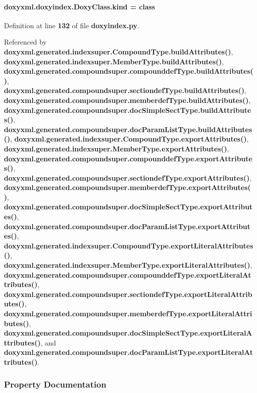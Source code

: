 \paragraph[{kind}]{ doxyxml.\+doxyindex.\+Doxy\+Class.\+kind = \textquotesingle{}class\textquotesingle{}\hspace{0.3cm}{\ttfamily [static]}}\label{classdoxyxml_1_1doxyindex_1_1DoxyClass_a4d98411ad8496f2dfd061280b97adfd7}


Definition at line {\bf 132} of file {\bf doxyindex.\+py}.



Referenced by {\bf doxyxml.\+generated.\+indexsuper.\+Compound\+Type.\+build\+Attributes()}, {\bf doxyxml.\+generated.\+indexsuper.\+Member\+Type.\+build\+Attributes()}, {\bf doxyxml.\+generated.\+compoundsuper.\+compounddef\+Type.\+build\+Attributes()}, {\bf doxyxml.\+generated.\+compoundsuper.\+sectiondef\+Type.\+build\+Attributes()}, {\bf doxyxml.\+generated.\+compoundsuper.\+memberdef\+Type.\+build\+Attributes()}, {\bf doxyxml.\+generated.\+compoundsuper.\+doc\+Simple\+Sect\+Type.\+build\+Attributes()}, {\bf doxyxml.\+generated.\+compoundsuper.\+doc\+Param\+List\+Type.\+build\+Attributes()}, {\bf doxyxml.\+generated.\+indexsuper.\+Compound\+Type.\+export\+Attributes()}, {\bf doxyxml.\+generated.\+indexsuper.\+Member\+Type.\+export\+Attributes()}, {\bf doxyxml.\+generated.\+compoundsuper.\+compounddef\+Type.\+export\+Attributes()}, {\bf doxyxml.\+generated.\+compoundsuper.\+sectiondef\+Type.\+export\+Attributes()}, {\bf doxyxml.\+generated.\+compoundsuper.\+memberdef\+Type.\+export\+Attributes()}, {\bf doxyxml.\+generated.\+compoundsuper.\+doc\+Simple\+Sect\+Type.\+export\+Attributes()}, {\bf doxyxml.\+generated.\+compoundsuper.\+doc\+Param\+List\+Type.\+export\+Attributes()}, {\bf doxyxml.\+generated.\+indexsuper.\+Compound\+Type.\+export\+Literal\+Attributes()}, {\bf doxyxml.\+generated.\+indexsuper.\+Member\+Type.\+export\+Literal\+Attributes()}, {\bf doxyxml.\+generated.\+compoundsuper.\+compounddef\+Type.\+export\+Literal\+Attributes()}, {\bf doxyxml.\+generated.\+compoundsuper.\+sectiondef\+Type.\+export\+Literal\+Attributes()}, {\bf doxyxml.\+generated.\+compoundsuper.\+memberdef\+Type.\+export\+Literal\+Attributes()}, {\bf doxyxml.\+generated.\+compoundsuper.\+doc\+Simple\+Sect\+Type.\+export\+Literal\+Attributes()}, and {\bf doxyxml.\+generated.\+compoundsuper.\+doc\+Param\+List\+Type.\+export\+Literal\+Attributes()}.



\subsubsection{Property Documentation}
